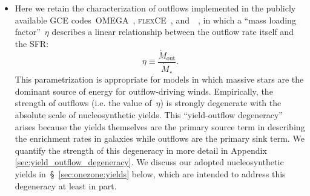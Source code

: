 \documentclass[ms.tex]{subfiles}
\begin{document}
\begin{itemize}
	\item Here we retain the characterization of outflows implemented in the
	publicly available GCE codes~\textsc{OMEGA}~\citep{Cote2017},
	\textsc{flexCE}~\citep{Andrews2017}, and~\vice~\citep{Johnson2020}, in
	which a ``mass loading factor''~$\eta$ describes a linear relationship
	between the outflow rate itself and the SFR:
	\begin{equation}
	\eta \equiv \frac{\dot{M}_\text{out}}{\dot{M}_\star}.
	\label{eq:mass_loading}
	\end{equation}
	This parametrization is appropriate for models in which massive stars are
	the dominant source of energy for outflow-driving winds.
	Empirically, the strength of outflows (i.e. the value of~$\eta$) is
	strongly degenerate with the absolute scale of nucleosynthetic yields.
	This ``yield-outflow degeneracy'' arises because the yields themselves are
	the primary source term in describing the enrichment rates in galaxies
	while outflows are the primary sink term.
	We quantify the strength of this degeneracy in more detail in Appendix
	\ref{sec:yield_outflow_degeneracy}.
	We discuss our adopted nucleosynthetic yields in~\S~\ref{sec:onezone:yields}
	below, which are intended to address this degeneracy at least in part.


\end{itemize}
\end{document}
